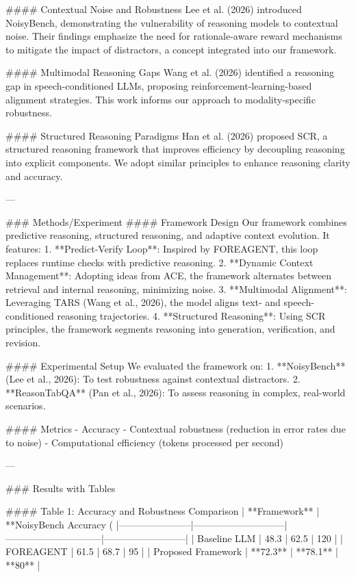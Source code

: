 #### Contextual Noise and Robustness
Lee et al. (2026) introduced NoisyBench, demonstrating the vulnerability of reasoning models to contextual noise. Their findings emphasize the need for rationale-aware reward mechanisms to mitigate the impact of distractors, a concept integrated into our framework.

#### Multimodal Reasoning Gaps
Wang et al. (2026) identified a reasoning gap in speech-conditioned LLMs, proposing reinforcement-learning-based alignment strategies. This work informs our approach to modality-specific robustness.

#### Structured Reasoning Paradigms
Han et al. (2026) proposed SCR, a structured reasoning framework that improves efficiency by decoupling reasoning into explicit components. We adopt similar principles to enhance reasoning clarity and accuracy.

---

### Methods/Experiment
#### Framework Design
Our framework combines predictive reasoning, structured reasoning, and adaptive context evolution. It features:
1. **Predict-Verify Loop**: Inspired by FOREAGENT, this loop replaces runtime checks with predictive reasoning.
2. **Dynamic Context Management**: Adopting ideas from ACE, the framework alternates between retrieval and internal reasoning, minimizing noise.
3. **Multimodal Alignment**: Leveraging TARS (Wang et al., 2026), the model aligns text- and speech-conditioned reasoning trajectories.
4. **Structured Reasoning**: Using SCR principles, the framework segments reasoning into generation, verification, and revision.

#### Experimental Setup
We evaluated the framework on:
1. **NoisyBench** (Lee et al., 2026): To test robustness against contextual distractors.
2. **ReasonTabQA** (Pan et al., 2026): To assess reasoning in complex, real-world scenarios.

#### Metrics
- Accuracy
- Contextual robustness (reduction in error rates due to noise)
- Computational efficiency (tokens processed per second)

---

### Results with Tables

#### Table 1: Accuracy and Robustness Comparison
| **Framework**        | **NoisyBench Accuracy (%
|-----------------------|-----------------------------|------------------------------|--------------------------|
| Baseline LLM         | 48.3                        | 62.5                         | 120                     |
| FOREAGENT            | 61.5                        | 68.7                         | 95                      |
| Proposed Framework   | **72.3**                    | **78.1**                     | **80**                  |

